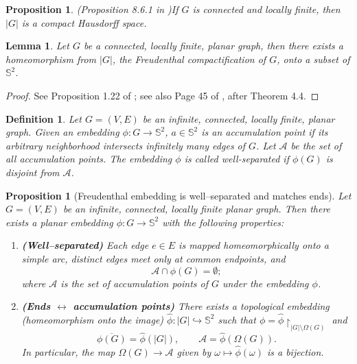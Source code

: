 \documentclass[11pt]{amsart}
\theoremstyle{plain}
\newtheorem{definition}[theorem]{Definition}
\newtheorem{lemma}[theorem]{Lemma}
\newtheorem{proposition}[theorem]{Proposition}
\numberwithin{equation}{section}
\numberwithin{figure}{section}
\begin{document}
\begin{proposition}(Proposition 8.6.1 in \cite{Diestel2017})If $G$ is connected and locally finite, then $|G|$ is a compact Hausdorff space.
\end{proposition}





\begin{lemma}\label{l23}Let $G$ be a connected, locally finite, planar graph, then there exists a homeomorphism from $|G|$, the Freudenthal compactification of $G$, onto a subset of $\mathbb{S}^2$.
\end{lemma}

\begin{proof}See Proposition 1.22 of \cite{JPM23}; see also Page 45 of \cite{hb09}, after Theorem 4.4.
\end{proof}




\begin{definition}\label{df31}
Let $G=(V,E)$ be an infinite, connected, locally finite, planar graph. Given an embedding $\phi:G\rightarrow \mathbb{S}^2$, $a\in \mathbb{S}^2$ is an accumulation point if its arbitrary neighborhood intersects infinitely many edges of $G$. Let $\mathcal{A}$ be the set of all accumulation points. The embedding $\phi$ is called well-separated if $\phi(G)$ is disjoint from $\mathcal{A}$.
\end{definition}


\begin{proposition}[Freudenthal embedding is well--separated and matches ends]\label{th52}
Let $G=(V,E)$ be an infinite, connected, locally finite planar graph. Then there exists a planar embedding
$\phi:G\to\mathbb{S}^2$ with the following properties:
\begin{enumerate}[label=(\roman*)]
\item \textbf{(Well--separated)} Each edge $e\in E$ is mapped homeomorphically onto a simple arc,
distinct edges meet only at common endpoints, and
\[
 \mathcal{A}\cap \phi(G)=\emptyset;
\]
where $\mathcal{A}$ is the set of accumulation points of $G$ under the embedding $\phi$.
\item \textbf{(Ends $\leftrightarrow$ accumulation points)} There exists a topological embedding (homeomorphism onto the image)
$\widehat\phi:|G|\hookrightarrow \mathbb{S}^2$ such that $\phi=\widehat\phi\!\upharpoonright_{|G|\setminus \Omega(G)}$ and
\[
\overline{\phi(G)}=\widehat\phi(|G|),\qquad
\mathcal{A}=\widehat\phi(\Omega(G)).
\]
In particular, the map $\Omega(G)\to \mathcal{A}$ given by $\omega\mapsto \widehat\phi(\omega)$ is a bijection.
\end{enumerate}
\end{proposition}
\end{document}
